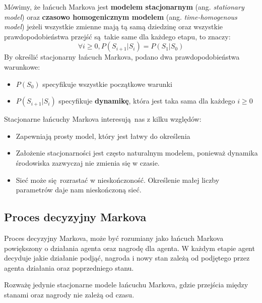 \documentclass[a4paper, 12pt,oneside]{book}
\begin{document}
Mówimy, że łańcuch Markova jest \textbf{modelem stacjonarnym} (ang.
\textit{stationary model}) oraz \textbf{czasowo homogenicznym modelem} (ang.
\textit{time-homogenous model}) jeżeli wszystkie zmienne mają tą samą dziedzinę
oraz wszystkie prawdopodobieństwa przejść są takie same dla każdego etapu, to
znaczy:
\[\forall i \ge 0, P(S_{i+1}|S_i) = P(S_1|S_0)\]
By określić stacjonarny łańcuch Markova, podano dwa prawdopodobieństwa
warunkowe:
\begin{itemize}
		\setlength\itemsep{-0.4em}
	\item $P(S_0)$ specyfikuje wszystkie początkowe warunki
	\item $P(S_{i+1} | S_i)$ specyfikuje \textbf{dynamikę}, która jest taka
		sama dla każdego $i \ge 0$
\end{itemize}
Stacjonarne łańcuchy Markova interesują nas z kilku względów:
\begin{itemize}
		\setlength\itemsep{-0.4em}
	\item Zapewniają prosty model, który jest łatwy do określenia
	\item Założenie stacjonarności jest często naturalnym modelem, ponieważ
		dynamika środowiska zazwyczaj nie zmienia się w czasie.
	\item Sieć może się rozrastać w nieskończoność. Określenie małej liczby
		parametrów daje nam nieskończoną
		sieć\cite{ai_foundations_markov_chains}.
\end{itemize}

\subsection{Proces decyzyjny Markova}
Proces decyzyjny Markova, może być rozumiany jako łańcuch Markova powiększony o
działania agenta oraz nagrodę dla agenta. W każdym etapie agent decyduje jakie
działanie podjąć, nagroda i nowy stan zależą od podjętego przez agenta
działania oraz poprzedniego stanu. 

Rozważę jedynie stacjonarne modele łańcuchu Markova, gdzie przejścia między
stanami oraz nagrody nie zależą od czasu. 
\end{document}
